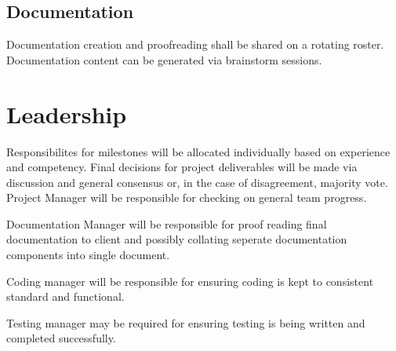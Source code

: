 \documentclass[11pt, letterpaper]{article}
\begin{document}
\subsection{Documentation}
Documentation creation and proofreading shall be shared on a rotating roster.
Documentation content can be generated via brainstorm sessions.

\section{Leadership}
Responsibilites for milestones will be allocated individually based on experience and competency.
Final decisions for project deliverables will be made via discussion and general consensus or, in 
the case of disagreement, majority vote.
Project Manager will be responsible for checking on general team progress.\par
Documentation Manager will be responsible for proof reading final documentation to client and possibly
collating seperate documentation components into single document.\par
Coding manager will be responsible for ensuring coding is kept to consistent standard and functional.\par
Testing manager may be required for ensuring testing is being written and completed successfully.
\end{document}
